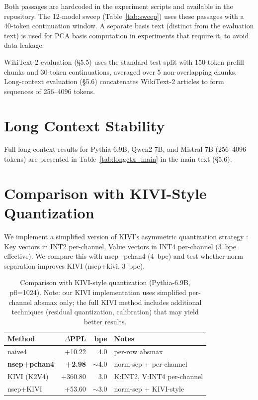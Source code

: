 \documentclass[11pt]{article}
\begin{document}
Both passages are hardcoded in the experiment scripts and available in the repository. The 12-model sweep (Table~\ref{tab:sweep}) uses these passages with a 40-token continuation window. A separate basis text (distinct from the evaluation text) is used for PCA basis computation in experiments that require it, to avoid data leakage.

WikiText-2 evaluation (\S5.5) uses the standard test split \citep{merity2017pointer} with 150-token prefill chunks and 30-token continuations, averaged over 5 non-overlapping chunks. Long-context evaluation (\S5.6) concatenates WikiText-2 articles to form sequences of 256--4096 tokens.

\section{Long Context Stability}

Full long-context results for Pythia-6.9B, Qwen2-7B, and Mistral-7B (256--4096 tokens) are presented in Table~\ref{tab:longctx_main} in the main text (\S5.6).

\section{Comparison with KIVI-Style Quantization}
\label{sec:kivi}

We implement a simplified version of KIVI's asymmetric quantization strategy \citep{liu2024kivi}: Key vectors in INT2 per-channel, Value vectors in INT4 per-channel (3~bpe effective). We compare this with nsep+pchan4 (4~bpe) and test whether norm separation improves KIVI (nsep+kivi, 3~bpe).

\begin{table}[h]
\centering
\small
\begin{tabular}{lrrl}
\toprule
Method & $\Delta$PPL & bpe & Notes \\
\midrule
naive4 & +10.22 & 4.0 & per-row absmax \\
\textbf{nsep+pchan4} & \textbf{+2.98} & ${\sim}$4.0 & norm-sep + per-channel \\
KIVI (K2V4) & +360.80 & 3.0 & K:INT2, V:INT4 per-channel \\
nsep+KIVI & +53.60 & ${\sim}$3.0 & norm-sep + KIVI-style \\
\bottomrule
\end{tabular}
\caption{Comparison with KIVI-style quantization (Pythia-6.9B, pfl=1024). Note: our KIVI implementation uses simplified per-channel absmax only; the full KIVI method includes additional techniques (residual quantization, calibration) that may yield better results.}
\label{tab:kivi}
\end{table}
\end{document}
